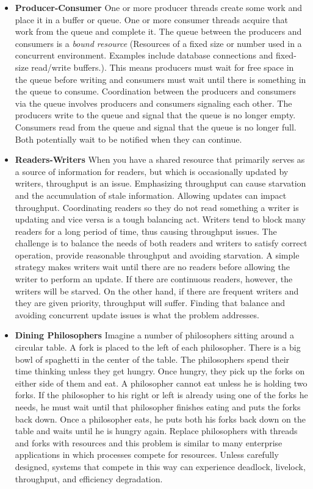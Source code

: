 \begin{itemize}
    \item \textbf{Producer-Consumer} One or more producer threads create some work and place it in a buffer or queue. One or more consumer threads acquire that work from the queue and complete it. The queue between the producers and consumers is a \textit{bound resource} (Resources of a fixed size or number used in a concurrent environment. Examples include database connections and fixed-size read/write buffers.). This means producers must wait for free space in the queue before writing and consumers must wait until there is something in the queue to consume. Coordination between the producers and consumers via the queue involves producers and consumers signaling each other. The producers write to the queue and signal that the queue is no longer empty. Consumers read from the queue and signal that the queue is no longer full. Both potentially wait to be notified when they can continue.
    \item \textbf{Readers-Writers} When you have a shared resource that primarily serves as a source of information for readers, but which is occasionally updated by writers, throughput is an issue. Emphasizing throughput can cause starvation and the accumulation of stale information. Allowing updates can impact throughput. Coordinating readers so they do not read something a writer is updating and vice versa is a tough balancing act. Writers tend to block many readers for a long period of time, thus causing throughput issues. The challenge is to balance the needs of both readers and writers to satisfy correct operation, provide reasonable throughput and avoiding starvation. A simple strategy makes writers wait until there are no readers before allowing the writer to perform an update. If there are continuous readers, however, the writers will be starved. On the other hand, if there are frequent writers and they are given priority, throughput will suffer. Finding that balance and avoiding concurrent update issues is what the problem addresses.
    \item \textbf{Dining Philosophers} Imagine a number of philosophers sitting around a circular table. A fork is placed to the left of each philosopher. There is a big bowl of spaghetti in the center of the table. The philosophers spend their time thinking unless they get hungry. Once hungry, they pick up the forks on either side of them and eat. A philosopher cannot eat unless he is holding two forks. If the philosopher to his right or left is already using one of the forks he needs, he must wait until that philosopher finishes eating and puts the forks back down. Once a philosopher eats, he puts both his forks back down on the table and waits until he is hungry again. Replace philosophers with threads and forks with resources and this problem is similar to many enterprise applications in which processes compete for resources. Unless carefully designed, systems that compete in this way can experience deadlock, livelock, throughput, and efficiency degradation.
\end{itemize}


